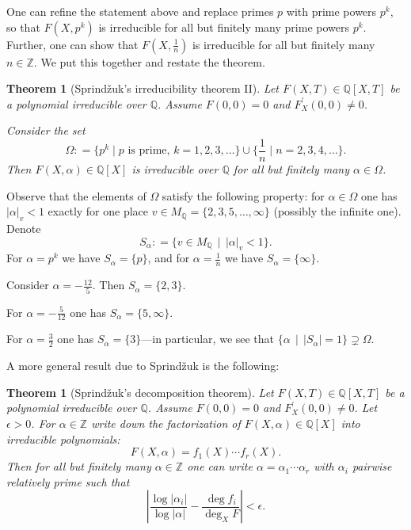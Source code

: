 \documentclass{article}
\newcommand{\dfn}{\mathrel{\mathop:}=}
\newcommand{\ZZ}{\mathbb{Z}}
\newcommand{\QQ}{\mathbb{Q}}
\newcommand{\examplesymbol}{$\blacktriangle$}
\renewcommand{\qedsymbol}{$\blacksquare$}
\theoremstyle{myplain}
\newtheorem{theorem}[proposition]{Theorem}
\theoremstyle{mydefinition}
\newenvironment{example}
  {\pushQED{\qed}\renewcommand{\qedsymbol}{\examplesymbol}\examplex}
  {\popQED\endexamplex}
\begin{document}
One can refine the statement above and replace primes $p$ with prime powers
$p^k$, so that $F (X, p^k)$ is irreducible for all but finitely many prime
powers $p^k$. Further, one can show that $F (X, \frac{1}{n})$ is irreducible for
all but finitely many $n \in \ZZ$. We put this together and restate the theorem.

\begin{theorem}[Sprind\v{z}uk's irreducibility theorem II]
  Let $F (X,T) \in \QQ [X,T]$ be a polynomial irreducible over $\QQ$. Assume
  $F (0,0) = 0$ and $F^\prime_X (0,0) \ne 0$.

  Consider the set
  \[ \Omega \dfn
    \{ p^k \mid p \text{ is prime, } k = 1, 2, 3, \ldots \} \cup
    \{ \frac{1}{n} \mid n = 2, 3, 4, \ldots \}. \]
  Then $F (X,\alpha) \in \QQ [X]$ is irreducible over $\QQ$ for all but finitely
  many $\alpha \in \Omega$.
\end{theorem}

Observe that the elements of $\Omega$ satisfy the following property: for
$\alpha \in \Omega$ one has $|\alpha|_v < 1$ exactly for one place
$v \in M_\QQ = \{ 2, 3, 5, \ldots, \infty \}$ (possibly the infinite
one). Denote
$$S_\alpha \dfn \{ v\in M_\QQ \,\mid\, |\alpha|_v < 1 \}.$$
For $\alpha = p^k$ we have $S_\alpha = \{ p \}$, and for $\alpha = \frac{1}{n}$
we have $S_\alpha = \{ \infty \}$.

\begin{example}
  Consider $\alpha = -\frac{12}{5}$. Then $S_\alpha = \{ 2, 3 \}$.

  For $\alpha = -\frac{5}{12}$ one has $S_\alpha = \{ 5, \infty \}$.

  For $\alpha = \frac{3}{2}$ one has $S_\alpha = \{ 3 \}$---in particular, we
  see that $\{ \alpha \,\mid\, |S_\alpha| = 1 \} \supsetneq \Omega$.
\end{example}

\vspace{1em}

A more general result due to Sprind\v{z}uk is the following:

\begin{theorem}[Sprind\v{z}uk's decomposition theorem]\label{theorem:sprindzuk-decomposition}
  Let $F (X,T) \in \QQ [X,T]$ be a polynomial irreducible over $\QQ$. Assume
  $F (0,0) = 0$ and $F^\prime_X (0,0) \ne 0$. Let $\epsilon > 0$. For
  $\alpha \in \ZZ$ write down the factorization of $F (X,\alpha) \in \QQ [X]$
  into irreducible polynomials:
  $$F (X,\alpha) = f_1 (X) \cdots f_r (X).$$
  Then for all but finitely many $\alpha \in \ZZ$ one can write
  $\alpha = \alpha_1 \cdots \alpha_r$ with $\alpha_i$ pairwise relatively prime
  such that
  $$\left| \frac{\log |\alpha_i|}{\log |\alpha|} - \frac{\deg f_i}{\deg_X F} \right| < \epsilon.$$
\end{theorem}
\end{document}
